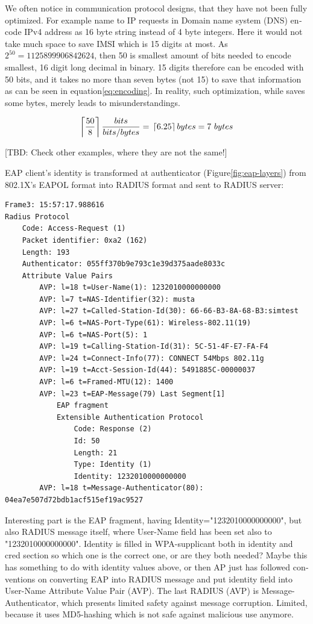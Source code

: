 \documentclass[12pt,a4paper,english]{tutthesis}
\begin{document}
\begin{otherlanguage}{english}
We often  notice in communication protocol designs, that they have not been
fully  optimized. For example 
name to IP requests in Domain name system (DNS) encode IPv4 address as
16 byte string instead of 4 byte integers.
Here it would not take much space to save  IMSI which is 15 digits at
most. As $2^{50} = 1125899906842624$,
then 50 is smallest amount of bits needed to encode smallest, 16 digit long
decimal in binary. 15 digits therefore can be encoded with
50 bits,  and it takes no more than seven bytes (not 15) to save that
information as can be seen in equation\ref{eq:encoding}.
In reality, such optimization, while saves some bytes, merely leads to misunderstandings.

\begin{equation}
 \label{eq:encoding}
  \left \lceil \frac{50}8 \right \rceil \frac{bits}{bits/bytes} = \\
   \left \lceil 6.25 \right \rceil bytes = 7~{}bytes
\end{equation}


[TBD: Check other examples, where  they are not the same!]



EAP client's identity is transformed at authenticator (Figure\ref{fig:eap-layers}) from 802.1X's 
EAPOL format  into RADIUS format and
sent to RADIUS server:
\begin{verbatim}
Frame3: 15:57:17.988616
Radius Protocol
    Code: Access-Request (1)
    Packet identifier: 0xa2 (162)
    Length: 193
    Authenticator: 055ff370b9e793c1e39d375aade8033c
    Attribute Value Pairs
        AVP: l=18 t=User-Name(1): 1232010000000000
        AVP: l=7 t=NAS-Identifier(32): musta
        AVP: l=27 t=Called-Station-Id(30): 66-66-B3-8A-68-B3:simtest
        AVP: l=6 t=NAS-Port-Type(61): Wireless-802.11(19)
        AVP: l=6 t=NAS-Port(5): 1
        AVP: l=19 t=Calling-Station-Id(31): 5C-51-4F-E7-FA-F4
        AVP: l=24 t=Connect-Info(77): CONNECT 54Mbps 802.11g
        AVP: l=19 t=Acct-Session-Id(44): 5491885C-00000037
        AVP: l=6 t=Framed-MTU(12): 1400
        AVP: l=23 t=EAP-Message(79) Last Segment[1]
            EAP fragment
            Extensible Authentication Protocol
                Code: Response (2)
                Id: 50
                Length: 21
                Type: Identity (1)
                Identity: 1232010000000000
        AVP: l=18 t=Message-Authenticator(80): 04ea7e507d72bdb1acf515ef19ac9527
\end{verbatim}
Interesting part is the EAP fragment, having
Identity="1232010000000000", but
also RADIUS message itself, where User-Name field has been set also 
to "1232010000000000". 
Identity is filled in WPA-supplicant both in identity and cred
section so which one is the correct one, or are they both needed?
Maybe this has something to do with identity
values above, or then AP just has followed conventions on converting
EAP into RADIUS message and put identity field into User-Name Attribute Value Pair (AVP).
The last RADIUS (AVP) is 
Message-Authenticator, which presents limited safety against message 
corruption. Limited, because it uses MD5-hashing which is not safe
against malicious use anymore.


\end{otherlanguage}
\end{document}
